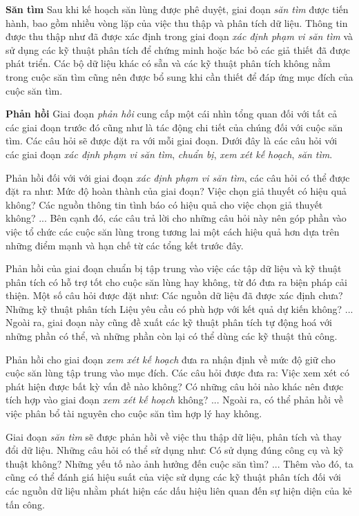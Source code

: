 \bigbreak\noindent
\textbf{Săn tìm}
\bigbreak\noindent
Sau khi kế hoạch săn lùng được phê duyệt, giai đoạn \textit{săn tìm} được tiến hành, bao gồm nhiều vòng lặp của việc thu thập và phân tích dữ liệu. Thông tin được thu thập như đã được xác định trong giai đoạn \textit{xác định phạm vi săn tìm} và sử dụng các kỹ thuật phân tích để chứng minh hoặc bác bỏ các giả thiết đã được phát triển. Các bộ dữ liệu khác có sẵn và các kỹ thuật phân tích không nằm trong cuộc săn tìm cũng nên được bổ sung khi cần thiết để đáp ứng mục đích của cuộc săn tìm.

\bigbreak\noindent
\textbf{Phản hồi}
\bigbreak\noindent
Giai đoạn \textit{phản hồi} cung cấp một cái nhìn tổng quan đối với tất cả các giai đoạn trước đó cũng như là tác động chi tiết của chúng đối với cuộc săn tìm. Các câu hỏi sẽ được đặt ra với mỗi giai đoạn. Dưới đây là các câu hỏi với các giai đoạn \textit{xác định phạm vi săn tìm}, \textit{chuẩn bị}, \textit{xem xét kế hoạch}, \textit{săn tìm}.

\bigbreak\noindent
Phản hồi đối với với giai đoạn \textit{xác định phạm vi săn tìm}, các câu hỏi có thể được đặt ra như: Mức độ hoàn thành của giai đoạn? Việc chọn giả thuyết có hiệu quả không? Các nguồn thông tin tình báo có hiệu quả cho việc chọn giả thuyết không? ... Bên cạnh đó, các câu trả lời cho những câu hỏi này nên góp phần vào việc tổ chức các cuộc săn lùng trong tương lai một cách hiệu quả hơn dựa trên những điểm mạnh và hạn chế từ các tổng kết trước đây.

\bigbreak\noindent
Phản hồi của giai đoạn chuẩn bị tập trung vào việc các tập dữ liệu và kỹ thuật phân tích có hỗ trợ tốt cho cuộc săn lùng hay không, từ đó đưa ra biện pháp cải thiện. Một số câu hỏi được đặt như: Các nguồn dữ liệu đã được xác định chưa? Những kỹ thuật phân tích  Liệu yêu cầu có phù hợp với kết quả dự kiến không? ... Ngoài ra, giai đoạn này cũng đề xuất các kỹ thuật phân tích tự động hoá với những phần có thể, và những phần còn lại có thể dùng các kỹ thuật thủ công.

\bigbreak\noindent
Phản hồi cho giai đoạn \textit{xem xét kế hoạch} đưa ra nhận định về mức độ giữ cho cuộc săn lùng tập trung vào mục đích. Các câu hỏi được đưa ra: Việc xem xét có phát hiện được bất kỳ vấn đề nào không? Có những câu hỏi nào khác nên được tích hợp vào giai đoạn \textit{xem xét kế hoạch} không? ... Ngoài ra, có thể phản hồi về việc phân bổ tài nguyên cho cuộc săn tìm hợp lý hay không.

\bigbreak\noindent
Giai đoạn \textit{săn tìm} sẽ được phản hồi về việc thu thập dữ liệu, phân tích và thay đổi dữ liệu. Những câu hỏi có thể sử dụng như: Có sử dụng đúng công cụ và kỹ thuật không? Những yếu tố nào ảnh hưởng đến cuộc săn tìm? ...  Thêm vào đó, ta cũng có thể đánh giá hiệu suất của việc sử dụng các kỹ thuật phân tích đối với các nguồn dữ liệu nhằm phát hiện các dấu hiệu liên quan đến sự hiện diện của kẻ tấn công.

